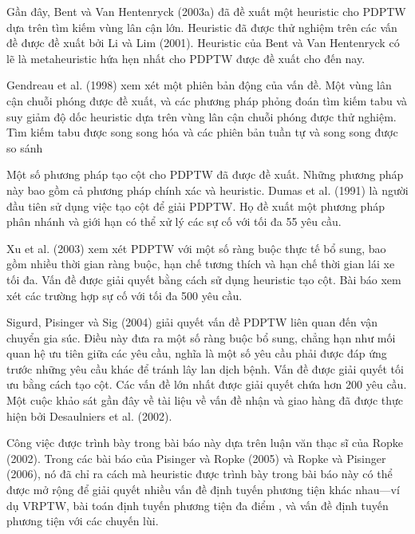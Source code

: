 Gần đây, Bent và Van Hentenryck (2003a) đã đề xuất một heuristic cho PDPTW dựa trên tìm kiếm vùng lân cận lớn. Heuristic đã được thử nghiệm trên các vấn đề được đề xuất bởi Li và Lim (2001). Heuristic của Bent và Van Hentenryck có lẽ là metaheuristic hứa hẹn nhất cho PDPTW được đề xuất cho đến nay.

Gendreau et al. (1998) xem xét một phiên bản động của vấn đề. Một vùng lân cận chuỗi phóng được đề xuất, và các phương pháp phỏng đoán tìm kiếm tabu và suy giảm độ dốc heuristic dựa trên vùng lân cận chuỗi phóng được thử nghiệm. Tìm kiếm tabu được song song hóa và các phiên bản tuần tự và song song được so sánh

Một số phương pháp tạo cột cho PDPTW đã được đề xuất. Những phương pháp này bao gồm cả phương pháp chính xác và heuristic. Dumas et al. (1991) là người đầu tiên sử dụng việc tạo cột để giải PDPTW. Họ đề xuất một phương pháp phân nhánh và giới hạn có thể xử lý các sự cố với tối đa 55 yêu cầu.

Xu et al. (2003) xem xét PDPTW với một số ràng buộc thực tế bổ sung, bao gồm nhiều thời gian ràng buộc, hạn chế tương thích và hạn chế thời gian lái xe tối đa. Vấn đề được giải quyết bằng cách sử dụng heuristic tạo cột. Bài báo xem xét các trường hợp sự cố với tối đa 500 yêu cầu.

Sigurd, Pisinger và Sig (2004) giải quyết vấn đề PDPTW liên quan đến vận chuyển gia súc. Điều này đưa ra một số ràng buộc bổ sung, chẳng hạn như mối quan hệ ưu tiên giữa các yêu cầu, nghĩa là một số yêu cầu phải được đáp ứng trước những yêu cầu khác để tránh lây lan dịch bệnh. Vấn đề được giải quyết tối ưu bằng cách tạo cột. Các vấn đề lớn nhất được giải quyết chứa hơn 200 yêu cầu. Một cuộc khảo sát gần đây về tài liệu về vấn đề nhận và giao hàng đã được thực hiện bởi Desaulniers et al. (2002).

Công việc được trình bày trong bài báo này dựa trên luận văn thạc sĩ của Ropke (2002). Trong các bài báo của Pisinger và Ropke (2005) và Ropke và Pisinger (2006), nó đã chỉ ra cách mà heuristic được trình bày trong bài báo này có thể được mở rộng để giải quyết nhiều vấn đề định tuyến phương tiện khác nhau—ví dụ VRPTW, bài toán định tuyến phương tiện đa điểm , và vấn đề định tuyến phương tiện với các chuyến lùi.
